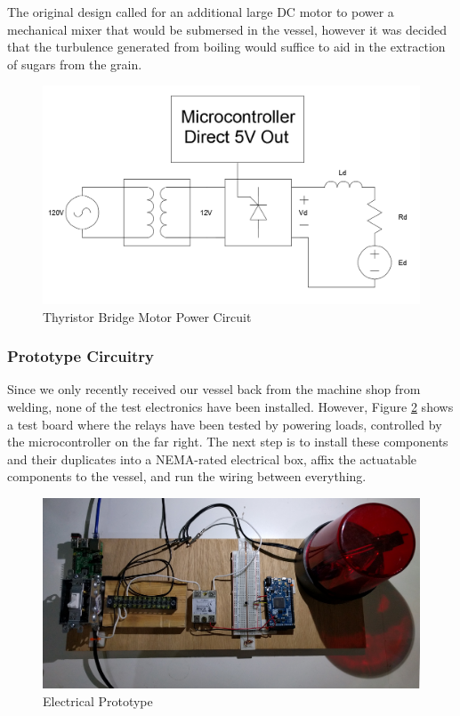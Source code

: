 \documentclass{article}
\begin{document}
\noindent The original design called for an additional large DC motor to power a mechanical mixer that would be submersed in the vessel, however it was decided that the turbulence generated from boiling would suffice to aid in the extraction of sugars from the grain.

\begin{figure}[H]
\begin{center}
\includegraphics[scale=0.40]{motor-thyristor-dc-circuit.png}
\caption{Thyristor Bridge Motor Power Circuit}
\label{fig:motor-thyristor-dc-circuit}
\end{center}
\end{figure}

\subsubsection{Prototype Circuitry}
Since we only recently received our vessel back from the machine shop from welding, none of the test electronics have been installed. However, Figure \ref{fig:electrical-prototype} shows a test board where the relays have been tested by powering loads, controlled by the microcontroller on the far right. The next step is to install these components and their duplicates into a NEMA-rated electrical box, affix the actuatable components to the vessel, and run the wiring between everything.

\begin{figure}[H]
\begin{center}
\includegraphics[scale=0.1]{electrical-prototype.jpg}
\caption{Electrical Prototype}
\label{fig:electrical-prototype}
\end{center}
\end{figure}
\end{document}
